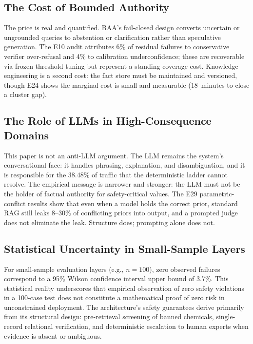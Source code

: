\subsection{The Cost of Bounded Authority}
The price is real and quantified. BAA's fail-closed design converts uncertain or ungrounded queries to abstention or clarification rather than speculative generation. The E10 audit attributes 6\% of residual failures to conservative verifier over-refusal and 4\% to calibration underconfidence; these are recoverable via frozen-threshold tuning but represent a standing coverage cost. Knowledge engineering is a second cost: the fact store must be maintained and versioned, though E24 shows the marginal cost is small and measurable (18~minutes to close a cluster gap).

\subsection{The Role of LLMs in High-Consequence Domains}
This paper is not an anti-LLM argument. The LLM remains the system's conversational face: it handles phrasing, explanation, and disambiguation, and it is responsible for the 38.48\% of traffic that the deterministic ladder cannot resolve. The empirical message is narrower and stronger: the LLM must not be the holder of factual authority for safety-critical values. The E29 parametric-conflict results show that even when a model holds the correct prior, standard RAG still leaks 8--30\% of conflicting priors into output, and a prompted judge does not eliminate the leak. Structure does; prompting alone does not.

\subsection{Statistical Uncertainty in Small-Sample Layers}
For small-sample evaluation layers (e.g., $n=100$), zero observed failures correspond to a 95\% Wilson confidence interval upper bound of 3.7\%. This statistical reality underscores that empirical observation of zero safety violations in a 100-case test does not constitute a mathematical proof of zero risk in unconstrained deployment. The architecture's safety guarantees derive primarily from its structural design: pre-retrieval screening of banned chemicals, single-record relational verification, and deterministic escalation to human experts when evidence is absent or ambiguous.

